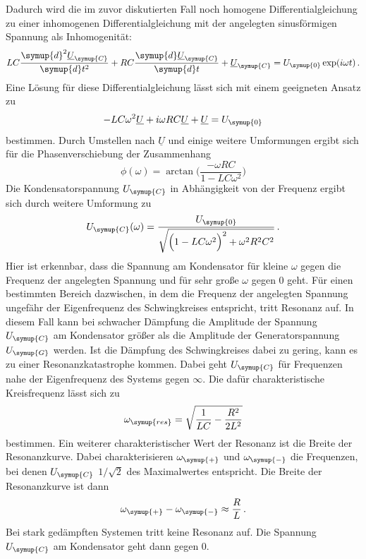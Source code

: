Dadurch wird die im zuvor diskutierten Fall noch homogene Differentialgleichung zu einer
inhomogenen Differentialgleichung mit der angelegten sinusförmigen Spannung
als Inhomogenität:
\begin{equation}
  LC\frac{\symup{d}^2\underline{U}_{\symup{C}}}{\symup{d}t^2}
  +RC\frac{\symup{d}\underline{U}_{\symup{C}}}{\symup{d}t}
  +\underline{U}_{\symup{C}} = U_{\symup{0}}\exp(i\omega t) \,.
\end{equation}
Eine Lösung für diese Differentialgleichung lässt sich mit einem geeigneten Ansatz
zu
\begin{equation}
  -LC\omega^2\underline{U}+i\omega R C\underline{U}+\underline{U}=U_{\symup{0}}
\end{equation}
bestimmen. Durch Umstellen nach $\underline{U}$ und einige weitere Umformungen ergibt
sich für die Phasenverschiebung der Zusammenhang
\begin{equation}
  \phi(\omega)=\arctan\biggl(\frac{-\omega R C}{1-L C \omega^2}\biggr)
  \label{eqn:phase}
\end{equation}
Die Kondensatorspannung $U_{\symup{C}}$ in Abhängigkeit von der Frequenz ergibt sich
durch weitere Umformung zu
\begin{equation}
  U_{\symup{C}}(\omega)=\frac{U_{\symup{0}}}{\sqrt{\Bigl(1-LC\omega^2\Bigr)^2+\omega^2 R^2 C^2}} \,.
\end{equation}
Hier ist erkennbar, dass die Spannung am Kondensator für kleine $\omega$ gegen
die Frequenz der angelegten Spannung und für sehr große $\omega$ gegen $0$ geht.
Für einen bestimmten Bereich dazwischen, in dem die Frequenz der angelegten Spannung
ungefähr der Eigenfrequenz des Schwingkreises entspricht, tritt Resonanz auf. In
diesem Fall kann bei schwacher Dämpfung die Amplitude der Spannung $U_{\symup{C}}$ am Kondensator größer
als die Amplitude der Generatorspannung $U_{\symup{G}}$ werden. Ist die Dämpfung
des Schwingkreises dabei zu gering, kann es zu einer Resonanzkatastrophe kommen.
Dabei geht $U_{\symup{C}}$ für Frequenzen nahe der Eigenfrequenz des Systems
gegen $\infty$. Die dafür charakteristische Kreisfrequenz lässt sich zu
\begin{equation}
  \omega_{\symup{res}}=\sqrt{\frac{1}{LC}-\frac{R^2}{2L^2}}
\end{equation}
bestimmen. Ein weiterer charakteristischer Wert der Resonanz ist die Breite
der Resonanzkurve. Dabei charakterisieren $\omega_{\symup{+}}$ und $\omega_{\symup{-}}$
die Frequenzen, bei denen $U_{\symup{C}}$ $1/\sqrt{2}$ des Maximalwertes entspricht.
Die Breite der Resonanzkurve ist dann
\begin{equation}
  \omega_{\symup{+}} - \omega_{\symup{-}} \approx \frac{R}{L} \,.
\end{equation}
Bei stark gedämpften Systemen tritt keine Resonanz auf. Die Spannung $U_{\symup{C}}$
am Kondensator geht dann gegen $0$.

